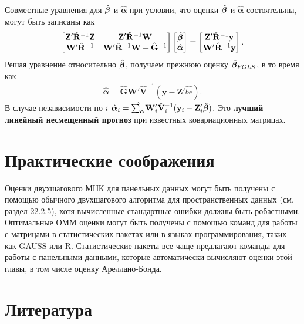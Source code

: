 Совместные  уравнения для $\hat{\bm{\beta}}$ и $\hat{\bm\alpha}$ при условии, что   оценки $\hat{\bm{\beta}}$ и $\hat{\bm\alpha}$ состоятельны, могут быть записаны как
\begin{align}
\begin{bmatrix}
\mathbf Z' \hat{\mathbf R}^{-1} \mathbf Z & \mathbf Z' \hat{\mathbf R}^{-1} \mathbf W \\
\mathbf W' \hat{\mathbf R}^{-1} & \mathbf W' \hat{\mathbf R}^{-1} \mathbf W + \hat{\mathbf G}^{-1}
\end{bmatrix}
\begin{bmatrix}
\hat{\bm{\beta}} \\
\hat{\bm\alpha}
\end{bmatrix}
=
\begin{bmatrix}
\mathbf Z' \hat{\mathbf R}^{-1} \mathbf y \\
\mathbf W' \hat{\mathbf R}^{-1} \mathbf y
\end{bmatrix}.
\nonumber
\end{align}
Решая уравнение относительно $\hat{\bm{\beta}}$, получаем прежнюю оценку $\hat{\bm{\beta}}_{FGLS}$, в то время как
\begin{align}
\hat{\bm\alpha}=\hat{\mathbf G} \mathbf W' \hat{\mathbf V}^{-1} (\mathbf y - \mathbf Z' \hat{be}).
\nonumber
\end{align}
В случае независимости по $i$ $\hat{\bm\alpha}_i=\hat{\sum_{\bm\alpha}}\mathbf W'_i \hat{\mathbf V}_i^{-1} (\mathbf y_i - \mathbf Z'_i \hat{\bm{\beta}})$. Это \textbf{лучший линейный несмещенный прогноз} при известных ковариационных матрицах.


\section{Практические соображения}

Оценки двухшагового МНК для панельных данных могут быть получены с помощью обычного двухшагового алгоритма для пространственных данных (см. раздел 22.2.5), хотя вычисленные стандартные ошибки должны быть робастными. Оптимальные ОММ оценки могут быть получены с помощью команд для работы с матрицами в статистических пакетах или в языках программирования, таких как GAUSS или R. Статистические пакеты все чаще предлагают команды для работы с панельными данными, которые автоматически вычисляют оценки этой главы, в том числе оценку Ареллано-Бонда.

\section{Литература}

